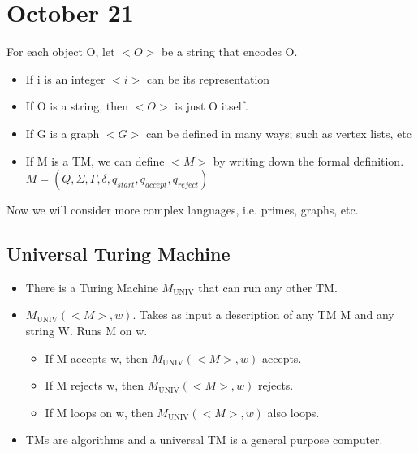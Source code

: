 \section{October 21}
For each object O, let $<O>$ be a string that encodes O. 
\begin{itemize}
    \item If i is an integer $<i>$ can be its representation
    \item If O is a string, then $<O>$ is just O itself.
    \item If G is a graph $<G>$ can be defined in many ways; such as vertex lists, etc
    \item If M is a TM, we can define $<M>$ by writing down the formal definition. $M = (Q, \Sigma, \Gamma, \delta, q_{start}, q_{accept}, q_{reject})$
\end{itemize}
Now we will consider more complex languages, i.e. primes, graphs, etc.

\subsection{Universal Turing Machine}
\begin{itemize}
  \item There is a Turing Machine $M_{\text{UNIV}}$ that can run any other TM.
  \item $M_{\text{UNIV}}(<M>, w)$. Takes as input a description of any TM M and any string W. Runs M on w.
  \begin{itemize}
    \item If M accepts w, then $M_{\text{UNIV}}(<M>, w)$ accepts.
    \item If M rejects w, then $M_{\text{UNIV}}(<M>, w)$ rejects.
    \item If M loops on w, then $M_{\text{UNIV}}(<M>, w)$ also loops.
  \end{itemize}
  \item TMs are algorithms and a universal TM is a general purpose computer.
\end{itemize}

